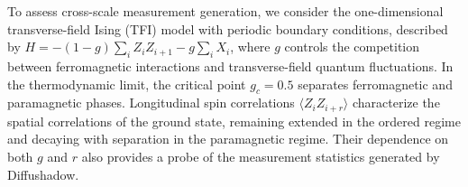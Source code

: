 \documentclass[pdflatex,sn-nature]{sn-jnl}%
\theoremstyle{thmstyleone}%
\theoremstyle{thmstyletwo}%
\theoremstyle{thmstylethree}%
\begin{document}

To assess cross-scale measurement generation, we consider the one-dimensional transverse-field Ising (TFI) model with periodic boundary conditions, described by $H=-(1-g)\sum_i Z_iZ_{i+1}-g\sum_i X_i$, where $g$ controls the competition between ferromagnetic interactions and transverse-field quantum fluctuations. In the thermodynamic limit, the critical point $g_c=0.5$ separates ferromagnetic and paramagnetic phases. Longitudinal spin correlations $\langle Z_iZ_{i+r}\rangle$ characterize the spatial correlations of the ground state, remaining extended in the ordered regime and decaying with separation in the paramagnetic regime. Their dependence on both $g$ and $r$ also provides a probe of the measurement statistics generated by Diffushadow.

\end{document}

